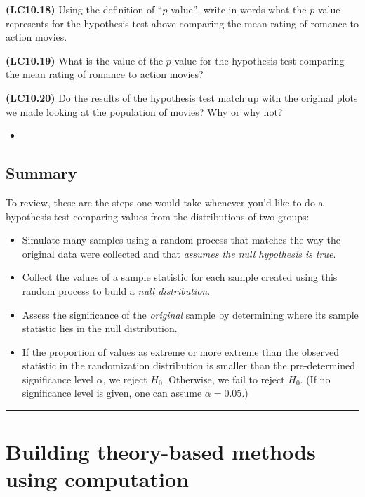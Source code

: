 \documentclass[12pt,]{krantz}
\newenvironment{rmdblock}[1]
  {\begin{shaded*}
  \begin{itemize}
  \renewcommand{\labelitemi}{
    \raisebox{-.7\height}[0pt][0pt]{
    }
  }
  \item
  }
  {
  \end{itemize}
  \end{shaded*}
  }
\newenvironment{learncheck}
  {\begin{rmdblock}{warning}}
  {\end{rmdblock}}
\theoremstyle{definition}
\theoremstyle{definition}
\theoremstyle{definition}
\theoremstyle{remark}
\begin{document}
\textbf{(LC10.18)} Using the definition of ``\(p\)-value'', write in
words what the \(p\)-value represents for the hypothesis test above
comparing the mean rating of romance to action movies.

\textbf{(LC10.19)} What is the value of the \(p\)-value for the
hypothesis test comparing the mean rating of romance to action movies?

\textbf{(LC10.20)} Do the results of the hypothesis test match up with
the original plots we made looking at the population of movies? Why or
why not?

\begin{learncheck}

\end{learncheck}

\subsection{Summary}\label{summary-5}

To review, these are the steps one would take whenever you'd like to do
a hypothesis test comparing values from the distributions of two groups:

\begin{itemize}
\item
  Simulate many samples using a random process that matches the way the
  original data were collected and that \emph{assumes the null
  hypothesis is true}.
\item
  Collect the values of a sample statistic for each sample created using
  this random process to build a \emph{null distribution}.
\item
  Assess the significance of the \emph{original} sample by determining
  where its sample statistic lies in the null distribution.
\item
  If the proportion of values as extreme or more extreme than the
  observed statistic in the randomization distribution is smaller than
  the pre-determined significance level \(\alpha\), we reject \(H_0\).
  Otherwise, we fail to reject \(H_0\). (If no significance level is
  given, one can assume \(\alpha = 0.05\).)
\end{itemize}

\begin{center}\rule{0.5\linewidth}{\linethickness}\end{center}

\section{Building theory-based methods using
computation}\label{theory-hypo}
\end{document}
